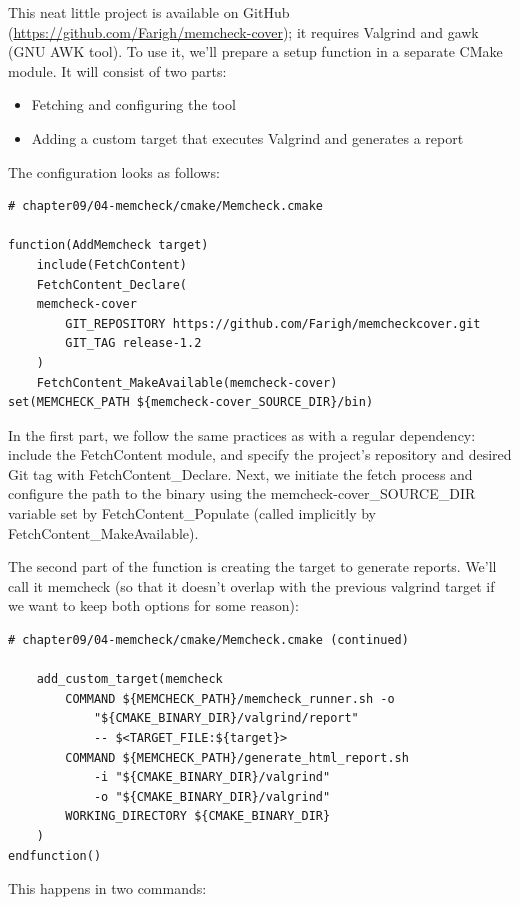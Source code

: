 This neat little project is available on GitHub (\url{https://github.com/Farigh/memcheck-cover}); it requires Valgrind and gawk (GNU AWK tool). To use it, we'll prepare a setup function in a separate CMake module. It will consist of two parts:

\begin{itemize}
\item 
Fetching and configuring the tool

\item 
Adding a custom target that executes Valgrind and generates a report
\end{itemize}

The configuration looks as follows:

\begin{lstlisting}[style=styleCMake]
# chapter09/04-memcheck/cmake/Memcheck.cmake

function(AddMemcheck target)
	include(FetchContent)
	FetchContent_Declare(
	memcheck-cover
		GIT_REPOSITORY https://github.com/Farigh/memcheckcover.git
		GIT_TAG release-1.2
	)
	FetchContent_MakeAvailable(memcheck-cover)
set(MEMCHECK_PATH ${memcheck-cover_SOURCE_DIR}/bin)
\end{lstlisting}

In the first part, we follow the same practices as with a regular dependency: include the FetchContent module, and specify the project's repository and desired Git tag with FetchContent\_Declare. Next, we initiate the fetch process and configure the path to the binary using the memcheck-cover\_SOURCE\_DIR variable set by FetchContent\_Populate (called implicitly by FetchContent\_MakeAvailable).

The second part of the function is creating the target to generate reports. We'll call it memcheck (so that it doesn't overlap with the previous valgrind target if we want to keep both options for some reason):

\begin{lstlisting}[style=styleCMake]
# chapter09/04-memcheck/cmake/Memcheck.cmake (continued)

	add_custom_target(memcheck
		COMMAND ${MEMCHECK_PATH}/memcheck_runner.sh -o
			"${CMAKE_BINARY_DIR}/valgrind/report"
			-- $<TARGET_FILE:${target}>
		COMMAND ${MEMCHECK_PATH}/generate_html_report.sh
			-i "${CMAKE_BINARY_DIR}/valgrind"
			-o "${CMAKE_BINARY_DIR}/valgrind"
		WORKING_DIRECTORY ${CMAKE_BINARY_DIR}
	)
endfunction()
\end{lstlisting}

This happens in two commands:


